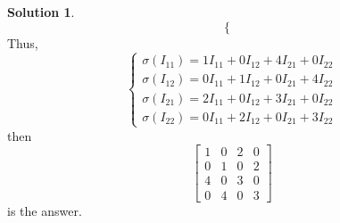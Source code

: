 \documentclass{article}
\theoremstyle{definition}
\newtheorem{sol}{Solution}[exe]
\begin{document}
\begin{sol}
$$\begin{cases}
    \end{cases}
    $$
    Thus,
    $$
    \begin{cases}
        \sigma(I_{11})=1I_{11}+0I_{12}+4I_{21}+0I_{22}\\
        \sigma(I_{12})=0I_{11}+1I_{12}+0I_{21}+4I_{22}\\
        \sigma(I_{21})=2I_{11}+0I_{12}+3I_{21}+0I_{22}\\
        \sigma(I_{22})=0I_{11}+2I_{12}+0I_{21}+3I_{22}
    \end{cases}
    $$
    then 
    $$
    \begin{bmatrix}
        1 & 0 & 2 & 0\\
        0 & 1 & 0 & 2\\
        4 & 0 & 3 & 0\\
        0 & 4 & 0 & 3
    \end{bmatrix}
    $$
    is the answer.
\end{sol}
\end{document}

